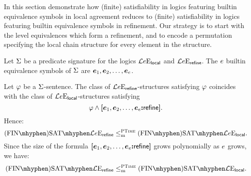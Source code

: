 
In this section demonstrate how (finite) satisfiability in logics featuring
builtin equivalence symbols in local agreement reduces to (finite)
satisfiability in logics featuring builtin equivalence symbols in refinement.
Our strategy is to start with the level equivalences which form a refinement,
and to encode a permutation specifying the local chain structure for every
element in the structure.

Let $\mathrm{\Sigma}$ be a predicate signature for the logics $\mathcal{L}{e}\mathrm{E}_{\mathsf{local}}$ and
$\mathcal{L}{e}\mathrm{E}_{\mathsf{refine}}$. The $e$ builtin equivalence symbols of $\mathrm{\Sigma}$ are
$\bm{e}_{1}, \bm{e}_{2}, \dots, \bm{e}_{e}$.

Let $\varphi$ be a $\mathrm{\Sigma}$-sentence.
The class of $\mathcal{L}{e}\mathrm{E}_{\mathsf{refine}}$-structures satisfying $\varphi$ coincides with
the class of $\mathcal{L}{e}\mathrm{E}_{\mathsf{local}}$-structures satisfying
\[
  \varphi \land {\bm{[}\bm{e}_{1},\bm{e}_{2},\dots,\bm{e}_{e}\mathord{\bm{:}}\mathsf{refine}\bm{]}}.
\] 
Hence:
\[
  \FinASat{\Fo\Eea\sze\agrefine} \red\cP
  \FinASat{\Fo\Eea\sze\aglocal}.
\]
Since the size of the formula ${\bm{[}\bm{e}_{1},\bm{e}_{2},\dots,\bm{e}_{e}\mathord{\bm{:}}\mathsf{refine}\bm{]}}$ grows 
polynomially as $e$ grows, we have:
\[
  \FinASat{\Fo\Eea\nosze\agrefine} \red\cP
  \FinASat{\Fo\Eea\nosze\aglocal}.
\]

